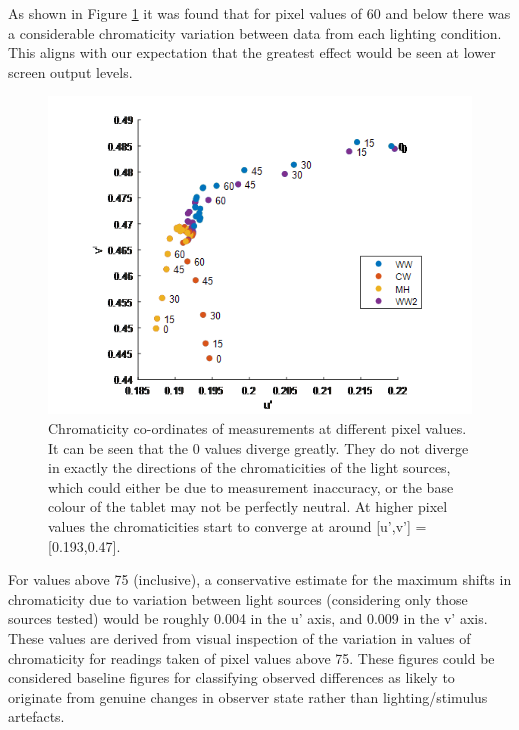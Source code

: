 As shown in Figure \ref{fig:pr6503} it was found that for pixel values of 60 and below there was a considerable chromaticity variation between data from each lighting condition. This aligns with our expectation that the greatest effect would be seen at lower screen output levels.

\begin{figure}[hbtp]
\includegraphics[max width=\textwidth]{figs/tablet/pamela_pr6503.png}
\caption{Chromaticity co-ordinates of measurements at different pixel values. It can be seen that the 0 values diverge greatly. They do not diverge in exactly the directions of the chromaticities of the light sources, which could either be due to measurement inaccuracy, or the base colour of the tablet may not be perfectly neutral. At higher pixel values the chromaticities start to converge at around [u',v'] = [0.193,0.47].} %
\label{fig:pr6503}
\end{figure}


For values above 75 (inclusive), a conservative estimate for the maximum shifts in chromaticity due to variation between light sources (considering only those sources tested) would be roughly 0.004 in the u' axis, and 0.009 in the v' axis. These values are derived from visual inspection of the variation in values of chromaticity for readings taken of pixel values above 75. These figures could be considered baseline figures for classifying observed differences as likely to originate from genuine changes in observer state rather than lighting/stimulus artefacts.

